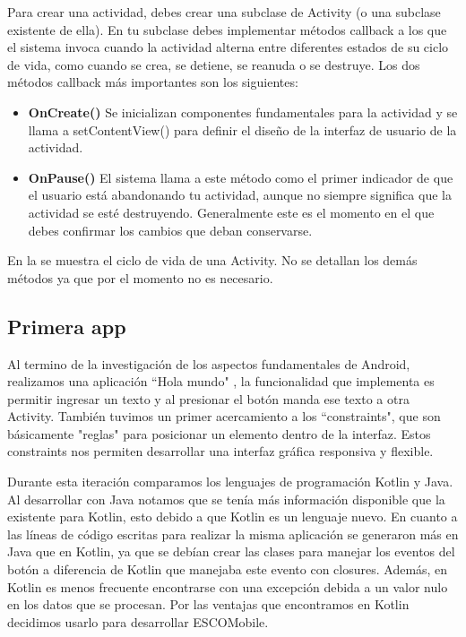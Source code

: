 \noindent
Para crear una actividad, debes crear una subclase de Activity (o una subclase existente de ella). En tu subclase debes implementar métodos callback a los que el sistema invoca cuando la actividad alterna entre diferentes estados de su ciclo de vida, como cuando se crea, se detiene, se reanuda o se destruye. Los dos métodos callback más importantes son los siguientes:
\begin{itemize}
	\item \textbf{OnCreate()} Se inicializan componentes fundamentales para la actividad y se llama a setContentView() para definir el diseño de la interfaz de usuario de la actividad.
	\item \textbf{OnPause()} El sistema llama a este método como el primer indicador de que el usuario está abandonando tu actividad, aunque no siempre significa que la actividad se esté destruyendo. Generalmente este es el momento en el que debes confirmar los cambios que deban conservarse.\cite{activity}
\end{itemize}
En la  se muestra el ciclo de vida de una Activity. No se detallan los demás métodos ya que por el momento no es necesario.


\subsection{Primera app}
\noindent
Al termino de la investigación de los aspectos fundamentales de Android, realizamos una aplicación ``Hola mundo" , la funcionalidad que implementa es permitir ingresar un texto y al presionar el botón manda ese texto a otra Activity. También tuvimos un primer acercamiento a los ``constraints", que son básicamente "reglas" para posicionar un elemento dentro de la interfaz. Estos constraints nos permiten desarrollar una interfaz gráfica responsiva y flexible.


\noindent
Durante esta iteración comparamos los lenguajes de programación Kotlin y Java. Al desarrollar con Java notamos que se tenía más información disponible que la existente para Kotlin, esto debido a que Kotlin es un lenguaje nuevo. En cuanto a las líneas de código escritas para realizar la misma aplicación se generaron más en Java que en Kotlin, ya que se debían crear las clases para manejar los eventos del botón a diferencia de Kotlin que manejaba este evento con closures. Además, en Kotlin es menos frecuente encontrarse con una excepción debida a un valor nulo en los datos que se procesan. Por las ventajas que encontramos en Kotlin decidimos usarlo para desarrollar ESCOMobile.

